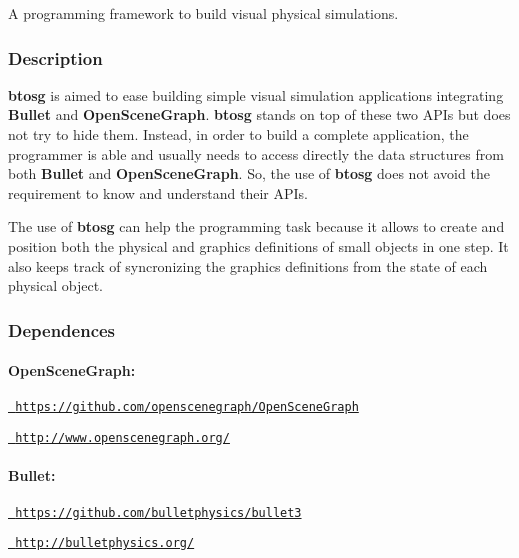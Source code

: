 A programming framework to build visual physical simulations.

\subsubsection*{Description}

{\bfseries{btosg}} is aimed to ease building simple visual simulation applications integrating {\bfseries{Bullet}} and {\bfseries{Open\+Scene\+Graph}}. {\bfseries{btosg}} stands on top of these two A\+P\+Is but does not try to hide them. Instead, in order to build a complete application, the programmer is able and usually needs to access directly the data structures from both {\bfseries{Bullet}} and {\bfseries{Open\+Scene\+Graph}}. So, the use of {\bfseries{btosg}} does not avoid the requirement to know and understand their A\+P\+Is.

The use of {\bfseries{btosg}} can help the programming task because it allows to create and position both the physical and graphics definitions of small objects in one step. It also keeps track of syncronizing the graphics definitions from the state of each physical object.

\subsubsection*{Dependences}

\paragraph*{Open\+Scene\+Graph\+:}


\begin{DoxyItemize}
\item \href{https://github.com/openscenegraph/OpenSceneGraph}{\texttt{ https\+://github.\+com/openscenegraph/\+Open\+Scene\+Graph}}
\item \href{http://www.openscenegraph.org/}{\texttt{ http\+://www.\+openscenegraph.\+org/}}
\end{DoxyItemize}

\paragraph*{Bullet\+:}


\begin{DoxyItemize}
\item \href{https://github.com/bulletphysics/bullet3}{\texttt{ https\+://github.\+com/bulletphysics/bullet3}}
\item \href{http://bulletphysics.org/}{\texttt{ http\+://bulletphysics.\+org/}}
\end{DoxyItemize}

